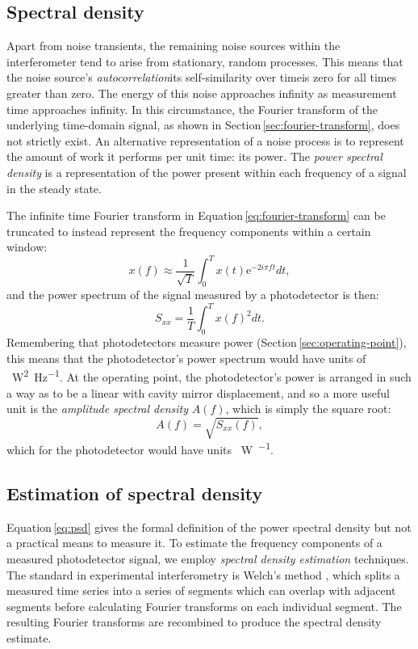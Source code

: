 \subsection{Spectral density}
Apart from noise transients, the remaining noise sources within the interferometer tend to arise from stationary, random processes. This means that the noise source's \emph{autocorrelation}\textemdash its self-similarity over time\textemdash is zero for all times greater than zero. The energy of this noise approaches infinity as measurement time approaches infinity. In this circumstance, the Fourier transform of the underlying time-domain signal, as shown in Section\,\ref{sec:fourier-transform}, does not strictly exist. An alternative representation of a noise process is to represent the amount of work it performs per unit time: its power. The \emph{power spectral density} is a representation of the power present within each frequency of a signal in the steady state.

The infinite time Fourier transform in Equation\,\ref{eq:fourier-transform} can be truncated to instead represent the frequency components within a certain window:
\begin{equation}
  x \left( f \right) \approx \frac{1}{\sqrt{T}} \int^{T}_{0} x \left( t \right) \text{e}^{-2i \pi f t} dt,
\end{equation}
and the power spectrum of the signal measured by a photodetector is then:
\begin{equation}
  \label{eq:psd}
  S_{xx} = \frac{1}{T} \int^{T}_{0} x \left( f \right)^2 dt.
\end{equation}
Remembering that photodetectors measure power (Section\,\ref{sec:operating-point}), this means that the photodetector's power spectrum would have units of \SI{}{\watt^2\per\hertz}. At the operating point, the photodetector's power is arranged in such a way as to be a linear with cavity mirror displacement, and so a more useful unit is the \emph{amplitude spectral density} $A \left( f \right)$, which is simply the square root:
\begin{equation}
  A \left( f \right) = \sqrt{S_{xx} \left( f \right)},
\end{equation}
which for the photodetector would have units \SI{}{\watt\per\sqrthz}.

\subsection{Estimation of spectral density}
Equation\,\ref{eq:psd} gives the formal definition of the power spectral density but not a practical means to measure it. To estimate the frequency components of a measured photodetector signal, we employ \emph{spectral density estimation} techniques. The standard in experimental interferometry is Welch's method \cite{Welch1967}, which splits a measured time series into a series of segments which can overlap with adjacent segments before calculating Fourier transforms on each individual segment. The resulting Fourier transforms are recombined to produce the spectral density estimate.

